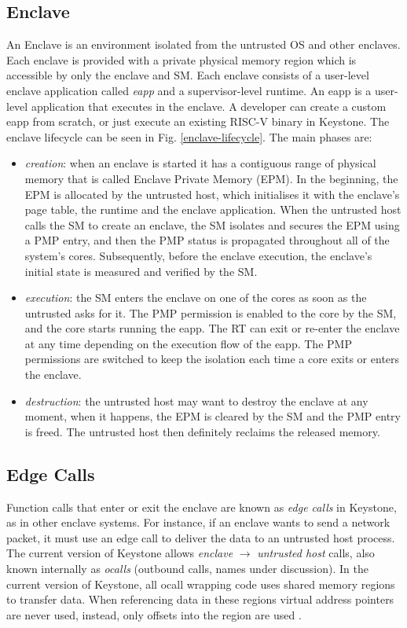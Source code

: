 \subsection{Enclave}
An Enclave is an environment isolated from the untrusted OS and other enclaves. Each enclave is provided with a private physical memory region which is accessible by only the enclave and SM. Each enclave consists of a user-level enclave application called \textit{eapp} and a supervisor-level runtime. An eapp is a user-level application that executes in the enclave. A developer can create a custom eapp from scratch, or just execute an existing RISC-V binary in Keystone. The enclave lifecycle can be seen in Fig. \ref{enclave-lifecycle}. The main phases are:
\begin{itemize}
    \item \textit{creation}: when an enclave is started it has a contiguous range of physical memory that is called Enclave Private Memory (EPM). In the beginning, the EPM is allocated by the untrusted host, which initialises it with the enclave's page table, the runtime and the enclave application. When the untrusted host calls the SM to create an enclave, the SM isolates and secures the EPM using a PMP entry, and then the PMP status is propagated throughout all of the system's cores. Subsequently, before the enclave execution, the enclave's initial state is measured and verified by the SM.
    \item \textit{execution}: the SM enters the enclave on one of the cores as soon as the untrusted asks for it. The PMP permission is enabled to the core by the SM, and the core starts running the eapp. The RT can exit or re-enter the enclave at any time depending on the execution flow of the eapp. The PMP permissions are switched to keep the isolation each time a core exits or enters the enclave.
    \item \textit{destruction}: the untrusted host may want to destroy the enclave at any moment, when it happens, the EPM is cleared by the SM and the PMP entry is freed. The untrusted host then definitely reclaims the released memory.
\end{itemize}

\subsection{Edge Calls}
Function calls that enter or exit the enclave are known as \textit{edge calls} in Keystone, as in other enclave systems. For instance, if an enclave wants to send a network packet, it must use an edge call to deliver the data to an untrusted host process. The current version of Keystone allows \textit{enclave} $\rightarrow$ \textit{untrusted host} calls, also known internally as \textit{ocalls} (outbound calls, names under discussion). In the current version of Keystone, all ocall wrapping code uses shared memory regions to transfer data. When referencing data in these regions virtual address pointers are never used, instead, only offsets into the region are used \cite{keystone-doc}. \\
 
